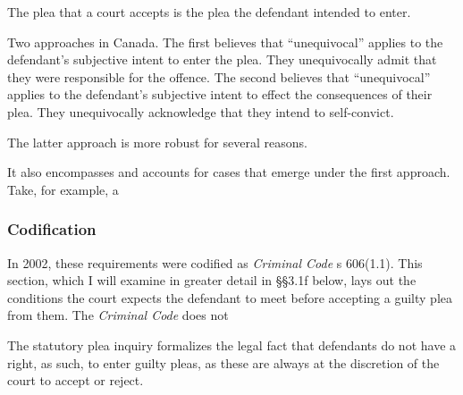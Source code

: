 The plea that a court accepts is the plea the defendant intended to enter.

Two approaches in Canada. The first believes that ``unequivocal'' applies to the defendant's subjective intent to enter the plea. They unequivocally admit that they were responsible for the offence. The second believes that ``unequivocal'' applies to the defendant's subjective intent to effect the consequences of their plea. They unequivocally acknowledge that they intend to self-convict.

The latter approach is more robust for several reasons. 

It also encompasses and accounts for cases that emerge under the first approach. Take, for example, a

\subsubsection{Codification}

In 2002, these requirements were codified as \textit{Criminal Code} s 606(1.1). This section, which I will examine in greater detail in §§3.1f below, lays out the conditions the court expects the defendant to meet before accepting a guilty plea from them. The \textit{Criminal Code} does not 

The statutory plea inquiry formalizes the legal fact that defendants do not have a right, as such, to enter guilty pleas, as these are always at the discretion of the court to accept or reject.
